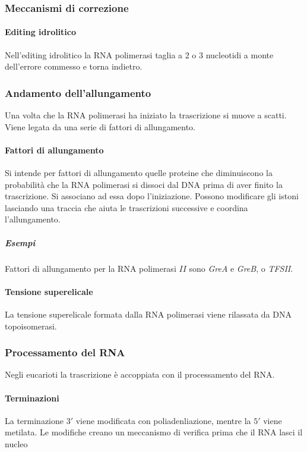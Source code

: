 		\subsubsection{Meccanismi di correzione}

			\paragraph{Editing idrolitico}
			Nell'editing idrolitico la RNA polimerasi taglia a $2$ o $3$ nucleotidi a monte dell'errore commesso e torna indietro.

		\subsubsection{Andamento dell'allungamento}
		Una volta che la RNA polimerasi ha iniziato la trascrizione si muove a scatti.
		Viene legata da una serie di fattori di allungamento.

			\paragraph{Fattori di allungamento}
			Si intende per fattori di allungamento quelle proteine che diminuiscono la probabilit\`a che la RNA polimerasi si dissoci dal DNA prima di aver finito la trascrizione.
			Si associano ad essa dopo l'iniziazione.
			Possono modificare gli istoni lasciando una traccia che aiuta le trascrizioni successive e coordina l'allungamento.

				\subparagraph{Esempi}
				Fattori di allungamento per la RNA polimerasi $II$ sono \emph{GreA} e \emph{GreB}, o \emph{TFSII}.
			
			\paragraph{Tensione superelicale}
			La tensione superelicale formata dalla RNA polimerasi viene rilassata da DNA topoisomerasi.

		\subsubsection{Processamento del RNA}
		Negli eucarioti la trascrizione \`e accoppiata con il processamento del RNA.

			\paragraph{Terminazioni}
			La terminazione $3'$ viene modificata con poliadenliazione, mentre la $5'$ viene metilata.
			Le modifiche creano un meccanismo di verifica prima che il RNA lasci il nucleo

